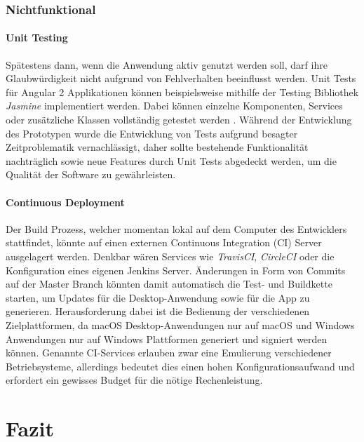 \subsection{Nichtfunktional}


\subsubsection{Unit Testing}

Spätestens dann, wenn die Anwendung aktiv genutzt werden soll, darf ihre Glaubwürdigkeit nicht aufgrund von Fehlverhalten beeinflusst werden.
Unit Tests für Angular 2 Applikationen können beispielsweise mithilfe der Testing Bibliothek \emph{Jasmine} implementiert werden.
Dabei können einzelne Komponenten, Services oder zusätzliche Klassen vollständig getestet werden \cite{Angul78:online}.
Während der Entwicklung des Prototypen \projectname{} wurde die Entwicklung von Tests aufgrund besagter Zeitproblematik vernachlässigt,
daher sollte bestehende Funktionalität nachträglich sowie neue Features durch Unit Tests abgedeckt werden, um die Qualität der Software zu gewährleisten.

\subsubsection{Continuous Deployment}

Der Build Prozess, welcher momentan lokal auf dem Computer des Entwicklers stattfindet, könnte auf einen externen Continuous Integration (CI) Server ausgelagert werden.
Denkbar wären Services wie \emph{TravisCI}, \emph{CircleCI} oder die Konfiguration eines eigenen Jenkins Server.
Änderungen in Form von Commits auf der Master Branch könnten damit automatisch die Test- und Buildkette starten, um Updates für die Desktop-Anwendung sowie für die App zu generieren.
Herausforderung dabei ist die Bedienung der verschiedenen Zielplattformen, da macOS Desktop-Anwendungen nur auf macOS und
Windows Anwendungen nur auf Windows Plattformen generiert und signiert werden können.
Genannte CI-Services erlauben zwar eine Emulierung verschiedener Betriebsysteme,
allerdings bedeutet dies einen hohen Konfigurationsaufwand und erfordert ein gewisses Budget für die nötige Rechenleistung.


\chapter{Fazit}

